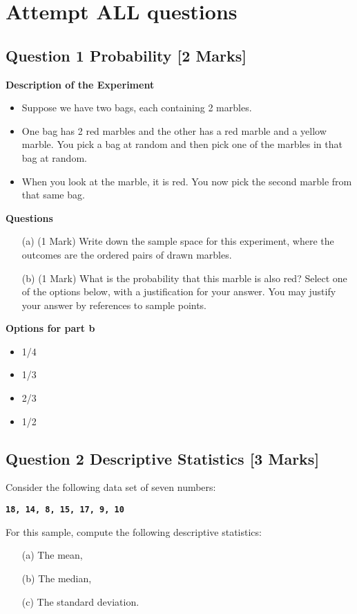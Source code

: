 \documentclass[a4paper,12pt]{article}
\begin{document}
\section*{Attempt ALL questions}

\subsection*{Question 1 Probability [2 Marks]}

\textbf{Description of the Experiment}
\begin{itemize}
\item Suppose we have two bags, each containing 2 marbles. 
\item One bag has 2 red marbles and
the other has a red marble and a yellow marble. 
You pick a bag at random and then pick
one of the marbles in that bag at random. 
\item When you look at the marble, it is red. 
You
now pick the second marble from that same bag.
\end{itemize} 
\textbf{Questions}
\begin{itemize}
\item[(a)](1 Mark)  Write down the sample space for this experiment, where the outcomes are the ordered pairs of drawn marbles.
\item[(b)](1 Mark) What is the probability that this marble
is also red? Select one of the options below, with a justification for your answer.
You may justify your answer by references to sample points.
\end{itemize}
\textbf{Options for part b}
\begin{center}
\begin{multicols}{4}
\begin{itemize}
\item 1/4
\item 1/3
\item 2/3
\item  1/2
\end{itemize}
\end{multicols}
\end{center}


\bigskip
\subsection*{Question 2 Descriptive Statistics [3 Marks]}

Consider the following data set of seven numbers:

\begin{center}
\textbf{\texttt{18, 14,  8, 15, 17,  9, 10 }}
\end{center}

\noindent For this sample, compute the following descriptive statistics:
\begin{itemize}
\item[(a)]  The mean,
\item[(b)]  The median,
\item[(c)]  The standard deviation.
\end{itemize}

\newpage
\end{document}
